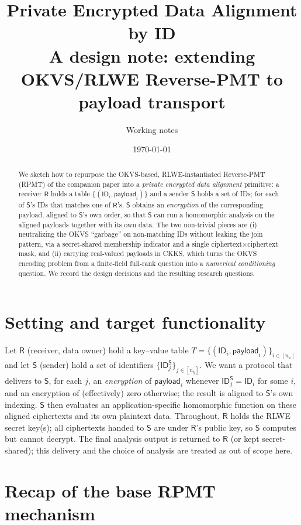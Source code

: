 \documentclass[11pt]{article}
\title{\textbf{Private Encrypted Data Alignment by ID}\\[4pt]
\large A design note: extending OKVS/RLWE Reverse-PMT to payload transport}
\author{Working notes}
\date{\today}
\newcommand{\Rcv}{\mathsf{R}}
\newcommand{\Snd}{\mathsf{S}}
\theoremstyle{plain}
\theoremstyle{definition}
\begin{document}
\maketitle

\begin{abstract}
We sketch how to repurpose the OKVS-based, RLWE-instantiated Reverse-PMT (RPMT) of the
companion paper into a \emph{private encrypted data alignment} primitive: a receiver
$\Rcv$ holds a table $\{(\mathsf{ID}_i,\mathsf{payload}_i)\}$ and a sender $\Snd$ holds a
set of IDs; for each of $\Snd$'s IDs that matches one of $\Rcv$'s, $\Snd$ obtains an
\emph{encryption} of the corresponding payload, aligned to $\Snd$'s own order, so that
$\Snd$ can run a homomorphic analysis on the aligned payloads together with its own data.
The two non-trivial pieces are (i) neutralizing the OKVS ``garbage'' on non-matching IDs
without leaking the join pattern, via a secret-shared membership indicator and a single
ciphertext$\times$ciphertext mask, and (ii) carrying real-valued payloads in CKKS, which
turns the OKVS encoding problem from a finite-field full-rank question into a
\emph{numerical conditioning} question. We record the design decisions and the resulting
research questions.
\end{abstract}

\section{Setting and target functionality}

Let $\Rcv$ (receiver, data owner) hold a key--value table
$T=\{(\mathsf{ID}_i,\mathsf{payload}_i)\}_{i\in[n_x]}$ and let $\Snd$ (sender) hold a set of
identifiers $\{\mathsf{ID}^\Snd_j\}_{j\in[n_y]}$. We want a protocol that delivers to $\Snd$,
for each $j$, an \emph{encryption} of $\mathsf{payload}_i$ whenever
$\mathsf{ID}^\Snd_j=\mathsf{ID}_i$ for some $i$, and an encryption of (effectively) zero
otherwise; the result is aligned to $\Snd$'s own indexing. $\Snd$ then evaluates an
application-specific homomorphic function on these aligned ciphertexts and its own
plaintext data. Throughout, $\Rcv$ holds the RLWE secret key(s); all ciphertexts handed to
$\Snd$ are under $\Rcv$'s public key, so $\Snd$ computes but cannot decrypt. The final
analysis output is returned to $\Rcv$ (or kept secret-shared); this delivery and the choice
of analysis are treated as out of scope here.

\section{Recap of the base RPMT mechanism}
\end{document}
